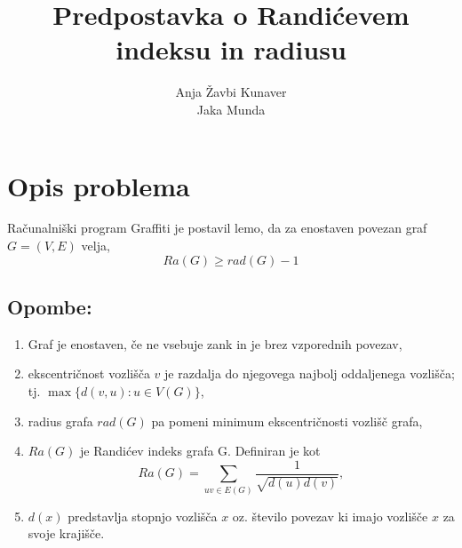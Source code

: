 \documentclass[a4paper, 10pt]{article}
\begin{document}
\title{Predpostavka o Randićevem indeksu in radiusu}
\author{Anja Žavbi Kunaver\\Jaka Munda}

\maketitle

\section{Opis problema}
Računalniški program Graffiti je postavil lemo, da za enostaven povezan graf $G=(V, E)$ velja, $$ Ra(G) \geq rad(G) -1$$


\subsection*{Opombe:}
\begin{enumerate}
\item Graf je enostaven, če ne vsebuje zank in je brez vzporednih povezav,
\item ekscentričnost vozlišča $v$ je razdalja do njegovega najbolj oddaljenega vozlišča; tj. $\max \{d(v,u) : u \in V(G) \}$,
\item radius grafa $rad(G)$ pa pomeni minimum ekscentričnosti vozlišč grafa,
\item
$Ra(G)$ je Randićev indeks grafa G. Definiran je kot
$$Ra(G) = \sum_{uv \in E(G)} \frac{1}{\sqrt{d(u) d(v)}},$$
\item $d(x)$ predstavlja stopnjo vozlišča $x$ oz. število povezav ki imajo vozlišče $x$ za svoje krajišče.
\end{enumerate}


\end{document}
